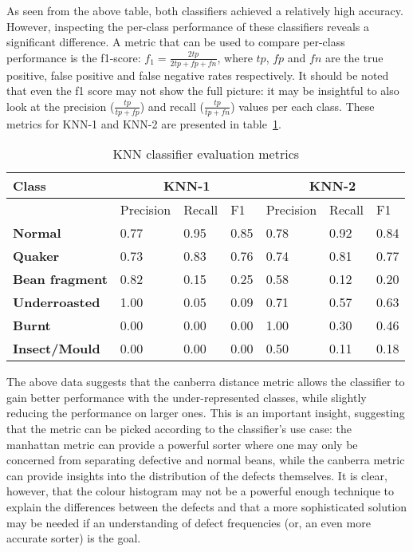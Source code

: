 As seen from the above table, both classifiers achieved a relatively high accuracy.
However, inspecting the per-class performance of these classifiers reveals a significant difference.
A metric that can be used to compare per-class performance is the f1-score:
$f_1 = \frac{2tp}{2tp + fp + fn}$, where $tp$, $fp$ and $fn$ are the true positive, false positive and false negative rates respectively.
It should be noted that even the f1 score may not show the full picture: it may be insightful to also look at the precision
($\frac{tp}{tp + fp}$) and recall ($\frac{tp}{tp + fn}$) values per each class.
These metrics for KNN-1 and KNN-2 are presented in table~\ref{tab:knnScores}.
\begin{table}
    \centering
    \begin{tabular}{*7l}
        \toprule
        \textbf{Class} & \multicolumn{3}{c}{KNN-1} & \multicolumn{3}{c}{KNN-2} \\
        \midrule
        {} & Precision & Recall & F1 & Precision & Recall & F1 \\
            \textbf{Normal} & 0.77 & 0.95 & 0.85 & 0.78 & 0.92 & 0.84  \\
            \textbf{Quaker} & 0.73 & 0.83 & 0.76 & 0.74 & 0.81 & 0.77 \\
            \textbf{Bean fragment} & 0.82 & 0.15 & 0.25 & 0.58 & 0.12 & 0.20 \\
            \textbf{Underroasted} & 1.00 & 0.05 & 0.09 & 0.71 & 0.57 & 0.63 \\
            \textbf{Burnt} & 0.00 & 0.00 & 0.00 & 1.00 & 0.30 & 0.46 \\
            \textbf{Insect/Mould} & 0.00 & 0.00 & 0.00 & 0.50 & 0.11 & 0.18  \\
        \bottomrule
    \end{tabular}
    \caption{KNN classifier evaluation metrics}
    \label{tab:knnScores}
\end{table}

The above data suggests that the canberra distance metric allows the classifier to gain better
performance with the under-represented classes, while slightly reducing the performance on larger ones.
This is an important insight, suggesting that the metric can be picked according to the classifier's use case:
the manhattan metric can provide a powerful sorter where one may only be concerned from separating defective and normal beans,
while the canberra metric can provide insights into the distribution of the defects themselves.
It is clear, however, that the colour histogram may not be a powerful enough technique to explain the differences between
the defects and that a more sophisticated solution may be needed if an understanding of defect frequencies (or, an even more accurate sorter)
is the goal.


